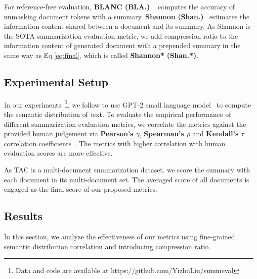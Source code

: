 For reference-free evaluation, 
\textbf{BLANC (BLA.)}
~\cite{blanc} computes the accuracy of unmasking document tokens with a summary.
\textbf{Shannon (Shan.)}~\cite{shannon22} estimates the information content shared between a document and its summary.
As Shannon is the SOTA summarization evaluation metric, 
we add compression ratio to the information content of generated document with a prepended summary in the same way as Eq.\ref{eq:final}, which is called \textbf{Shannon* (Shan.*)}.



\subsection{Experimental Setup}
In our experiments~\footnote{Data and code are available at https://github.com/YizhuLiu/summeval}, we follow \citet{shannon22} to use GPT-2 small language model~\cite{GPT2} to compute the semantic distribution of text.
To evaluate the empirical performance of different summarization evaluation metrics, we correlate the metrics against the provided human judgement via \textbf{Pearson's $\gamma$}, \textbf{Spearman's $\rho$} and 
\textbf{Kendall's $\tau$} correlation coefficients~\cite{pearson,spearman,kendall}. 
The metrics with higher correlation with human evaluation scores are more effective.

As TAC is a multi-document summarization dataset,
we score the summary with each document in its multi-document set.
The averaged score of all documents is engaged as the final score of our proposed metrics.


\subsection{Results}
In this section, we 
analyze the effectiveness of our metrics using fine-grained semantic distribution correlation and introducing compression ratio.


